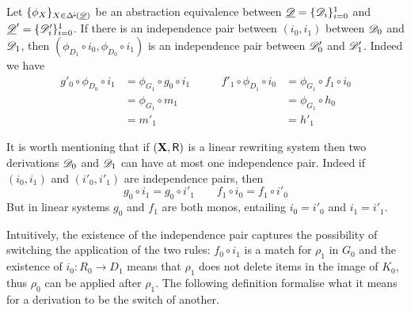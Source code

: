 \begin{remark}\label{rem:seqabs}
Let $\{\phi_X\}_{X\in \Delta^{\hspace{-1pt}\downarrow\hspace{-1pt}}(\underline{\mathscr{D}})}$ be an abstraction equivalence between $\underline{\mathscr{D}}=\{\mathscr{D}_i\}_{i=0}^1$ and $\underline{\mathscr{D}}'=\{\mathscr{D}'_i\}_{i=0}^1$. If there is an independence pair between $(i_0, i_1)$ between $\mathscr{D}_0$ and $\mathscr{D}_1$, then $(\phi_{D_1}\circ i_0, \phi_{D_0}\circ i_1)$ is an independence pair between $\mathscr{D}'_0$ and $\mathscr{D}'_1$. Indeed we have
\[\begin{split}
g'_0\circ \phi_{D_0}\circ i_1&=\phi_{G_1}\circ g_0\circ i_1\\&=\phi_{G_1}\circ m_1\\&= m'_1
\end{split}\qquad \begin{split}
f'_1\circ \phi_{D_1}\circ i_0&=\phi_{G_1}\circ f_1\circ i_0\\&=\phi_{G_1}\circ h_0\\&= h'_1
\end{split}\]
\end{remark}

\begin{remark}\label{rem:uni}
	It is worth mentioning that if $(\textbf {\textup{X}}, \mathsf{R})$ is a linear rewriting system then two derivations $\mathscr{D}_0$ and $\mathscr{D}_1$ can have at most one independence pair. Indeed if $(i_0,i_1)$ and $(i'_0, i'_1)$ are independence pairs, then
	\[g_0\circ i_1 = g_0\circ i'_1 \qquad f_1\circ i_0=f_1\circ i'_0\]
	But in linear systems $g_0$ and $f_1$ are both monos, entailing $i_0=i'_0$ and $i_1=i'_1$.
\end{remark}

Intuitively, the existence of the independence pair
captures the possibility of switching the application of the two rules:
$f_0 \circ i_1$ is a match for $\rho_1$ in $G_0$ and the
existence of $i_0 : R_0 \to D_1$ means that $\rho_1$ does not delete
items in the image of $K_0$, thus $\rho_0$ can be applied after
$\rho_1$. The following definition formalise what it means for a derivation to be the switch of another.

